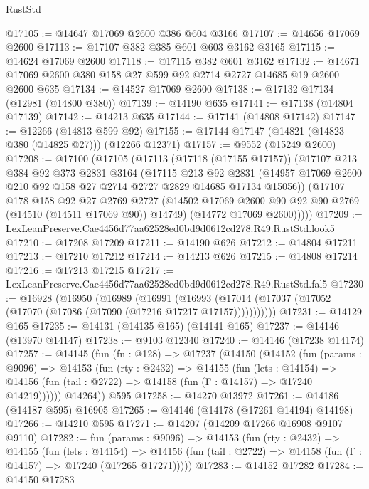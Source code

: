 \begin{lexlean}{RustStd}
\begin{coremodule}
@17105 := @14647 @17069 @2600 @386 @604 @3166
@17107 := @14656 @17069 @2600
@17113 := @17107 @382 @385 @601 @603 @3162 @3165
@17115 := @14624 @17069 @2600
@17118 := @17115 @382 @601 @3162
@17132 := @14671 @17069 @2600 @380 @158 @27 @599 @92 @2714 @2727 @14685 @19 @2600 @2600 @635
@17134 := @14527 @17069 @2600
@17138 := @17132 @17134 (@12981 (@14800 @380))
@17139 := @14190 @635
@17141 := @17138 (@14804 @17139)
@17142 := @14213 @635
@17144 := @17141 (@14808 @17142)
@17147 := @12266 (@14813 @599 @92)
@17155 := @17144 @17147 (@14821 (@14823 @380 (@14825 @27))) (@12266 @12371)
@17157 := @9552 (@15249 @2600)
@17208 := @17100
    (@17105
      (@17113
        (@17118 (@17155 @17157))
        (@17107
          @213
          @384
          @92
          @373
          @2831
          @3164
          (@17115
            @213
            @92
            @2831
            (@14957 @17069 @2600 @210 @92 @158 @27 @2714 @2727 @2829 @14685 @17134 @15056))
          (@17107
            @178
            @158
            @92
            @27
            @2769
            @2727
            (@14502 @17069 @2600 @90 @92 @90 @2769 (@14510 (@14511 @17069 @90)) @14749)
            (@14772 @17069 @2600)))))
@17209 := LexLeanPreserve.Cae4456d77aa62528ed0bd9d0612cd278.R49.RustStd.look5
@17210 := @17208 @17209
@17211 := @14190 @626
@17212 := @14804 @17211
@17213 := @17210 @17212
@17214 := @14213 @626
@17215 := @14808 @17214
@17216 := @17213 @17215
@17217 := LexLeanPreserve.Cae4456d77aa62528ed0bd9d0612cd278.R49.RustStd.fal5
@17230 := @16928
    (@16950
      (@16989
        (@16991
          (@16993 (@17014 (@17037 (@17052 (@17070 (@17086 (@17090 (@17216 @17217 @17157)))))))))))
@17231 := @14129 @165
@17235 := @14131 (@14135 @165) (@14141 @165)
@17237 := @14146 (@13970 @14147)
@17238 := @9103 @12340
@17240 := @14146 (@17238 @14174)
@17257 := @14145
    (fun (fn : @128) =>
    @17237
      (@14150
        (@14152
          (fun (params : @9096) =>
          @14153
            (fun (rty : @2432) =>
            @14155
              (fun (lets : @14154) =>
              @14156 (fun (tail : @2722) => @14158 (fun (Γ : @14157) => @17240 @14219))))))
        @14264))
    @595
@17258 := @14270 @13972
@17261 := @14186 (@14187 @595) @16905
@17265 := @14146 (@14178 (@17261 @14194) @14198)
@17266 := @14210 @595
@17271 := @14207 (@14209 @17266 @16908 @9107 @9110)
@17282 := fun (params : @9096) =>
  @14153
    (fun (rty : @2432) =>
    @14155
      (fun (lets : @14154) =>
      @14156 (fun (tail : @2722) => @14158 (fun (Γ : @14157) => @17240 (@17265 @17271)))))
@17283 := @14152 @17282
@17284 := @14150 @17283

\end{coremodule}
\end{lexlean}
